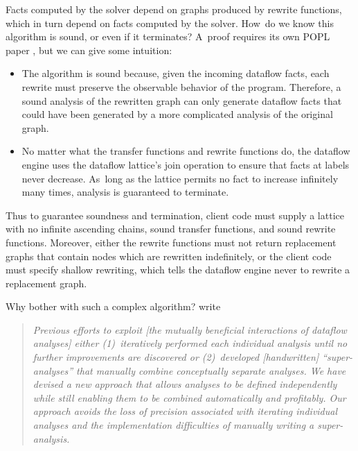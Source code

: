 \documentclass[blockstyle,preprint,natbib,nocopyrightspace]{sigplanconf}
\let\cite\citep
\begin{document}
Facts computed by the solver depend on graphs produced by rewrite
functions, which in turn depend on facts computed by the solver.
How~do we know this algorithm is sound, or even if it terminates?
A~proof requires its own POPL paper
\cite{lerner-grove-chambers:2002}, but we can give some
intuition:
\begin{itemize} 
\item
The algorithm is sound because, given the incoming dataflow facts,
each rewrite must preserve the observable behavior of the program.
Therefore, a sound analysis of the rewritten graph
can only generate dataflow facts that could have been
generated by a more complicated analysis of the original graph.
\item
No matter what the transfer functions and rewrite functions do,
the dataflow engine uses the dataflow lattice's join operation to ensure that
facts at labels never decrease. 
As~long as the lattice permits no fact to increase infinitely many
times, analysis is guaranteed to terminate.
\end{itemize}
Thus to guarantee soundness and termination, client code must supply a
lattice with no infinite ascending chains, sound transfer functions,
and sound rewrite functions.
Moreover, either the rewrite functions must not return replacement
graphs that contain nodes which are rewritten indefinitely,
or the client code must specify shallow rewriting, which tells the
dataflow engine never to rewrite a replacement graph.

Why bother with such a complex algorithm?
\ifcutting\else
\citet{lerner-grove-chambers:2002} write
\begin{quote}
\emph{Previous efforts to exploit [the mutually beneficial
interactions of dataflow analyses] either (1)~iteratively performed
each individual analysis until no further improvements are discovered
or (2)~developed [handwritten] ``super-analyses'' that manually
combine conceptually separate analyses. We have devised a new approach
that allows analyses to be defined independently while still enabling
them to be combined automatically and profitably. Our approach avoids
the loss of precision associated with iterating individual analyses
and the implementation difficulties of manually writing a
super-analysis.}
\end{quote}
\end{document}
